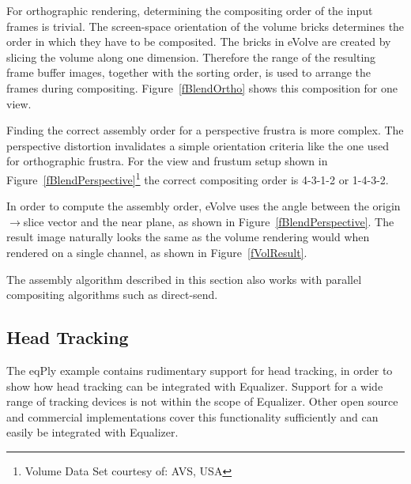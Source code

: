 \documentclass[10pt,a4]{scrartcl}
\newcommand{\fig}[1]{Figure~\ref{#1}}
\begin{document}
For orthographic rendering, determining the compositing order of the
input frames is trivial. The screen-space orientation of the volume
bricks determines the order in which they have to be composited. The
bricks in \textsf{eVolve} are created by slicing the volume along one
dimension. Therefore the range of the resulting frame buffer images,
together with the sorting order, is used to arrange the frames during
compositing. \fig{fBlendOrtho} shows this composition for one view.

Finding the correct assembly order for a perspective frustra is more
complex. The perspective distortion invalidates a simple orientation
criteria like the one used for orthographic frustra. For the view and
frustum setup shown in \fig{fBlendPerspective}\footnote{Volume Data Set
  courtesy of: AVS, USA} the correct compositing order is 4-3-1-2 or
1-4-3-2.

In order to compute the assembly order, \textsf{eVolve} uses the angle
between the origin$\rightarrow$slice vector and the near plane, as shown
in \fig{fBlendPerspective}. The result image naturally looks the same as
the volume rendering would when rendered on a single channel, as shown in
\fig{fVolResult}.

The assembly algorithm described in this section also works with parallel
compositing algorithms such as direct-send.

\subsection{Head Tracking}

The \textsf{eqPly} example contains rudimentary support for head
tracking, in order to show how head tracking can be integrated with
Equalizer. Support for a wide range of tracking devices is not within the
scope of Equalizer. Other open source and commercial implementations
cover this functionality sufficiently and can easily be integrated with
Equalizer.
\end{document}
